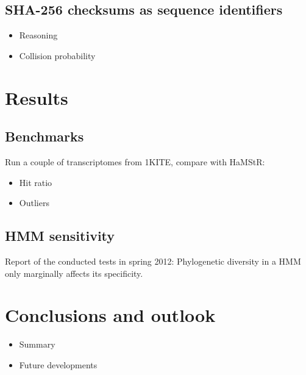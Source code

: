 \documentclass[a4paper]{scrartcl}
\begin{document}
\subsection{SHA-256 checksums as sequence identifiers}

\begin{itemize}
	\item Reasoning
	\item Collision probability
\end{itemize}

\clearpage

\section{Results}

\subsection{Benchmarks}

Run a couple of transcriptomes from 1KITE, compare with HaMStR:

\begin{itemize}
	\item Hit ratio
	\item Outliers
\end{itemize}

\subsection{HMM sensitivity}

Report of the conducted tests in spring 2012: Phylogenetic diversity in a HMM only marginally affects its specificity.

\section{Conclusions and outlook}

\begin{itemize}
	\item Summary
	\item Future developments
\end{itemize}
\end{document}
